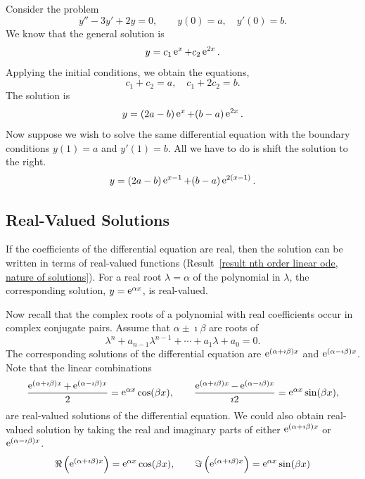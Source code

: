 \begin{Example}
  Consider the problem
  \[ 
  y'' - 3 y' + 2 y = 0, \qquad y(0) = a, \quad y'(0) = b.
  \]
  We know that the general solution is
  \[
  y = c_1 \mathop{\mathrm{e}}\nolimits^x + c_2 \mathop{\mathrm{e}}\nolimits^{2x}.
  \]
  Applying the initial conditions, we obtain the equations,
  \[
  c_1 + c_2 = a, \quad c_1 + 2 c_2 = b.
  \]
  The solution is
  \[
  y = (2 a - b) \mathop{\mathrm{e}}\nolimits^x + (b - a) \mathop{\mathrm{e}}\nolimits^{2 x}.
  \]
  Now suppose we wish to solve the same differential equation with the 
  boundary conditions $y(1) = a$ and $y'(1) = b$.  All we have to do is 
  shift the solution to the right.
  \[
  y = (2 a - b) \mathop{\mathrm{e}}\nolimits^{x-1} + (b - a) \mathop{\mathrm{e}}\nolimits^{2 (x-1)}.
  \]
\end{Example}











\subsection{Real-Valued Solutions}




If the coefficients of the differential equation are real, then the solution
can be written in terms of real-valued functions
(Result~\ref{result nth order linear ode, nature of solutions}).   
For a real root $\lambda = \alpha$ of the polynomial in $\lambda$, the corresponding
solution, $y = \mathop{\mathrm{e}}\nolimits^{\alpha x}$, is real-valued.  

Now recall that the complex
roots of a polynomial with real coefficients occur in complex conjugate
pairs.  Assume that $\alpha \pm \imath \beta$ are roots of
\[
\lambda^n + a_{n-1} \lambda^{n-1} + \cdots + a_1 \lambda + a_0 = 0.
\]
The corresponding solutions of the differential equation are
$\mathop{\mathrm{e}}\nolimits^{(\alpha + \imath \beta)x}$ and $\mathop{\mathrm{e}}\nolimits^{(\alpha - \imath \beta)x}$.  Note that the
linear combinations
\[
\frac{ \mathop{\mathrm{e}}\nolimits^{(\alpha + \imath \beta)x} + \mathop{\mathrm{e}}\nolimits^{(\alpha - \imath \beta)x}}{2}
= \mathop{\mathrm{e}}\nolimits^{\alpha x} \cos (\beta x), \qquad
\frac{ \mathop{\mathrm{e}}\nolimits^{(\alpha + \imath \beta)x} - \mathop{\mathrm{e}}\nolimits^{(\alpha - \imath \beta)x}}{\imath 2}
= \mathop{\mathrm{e}}\nolimits^{\alpha x} \sin (\beta x),
\]
are real-valued solutions of the differential equation.
We could also obtain real-valued solution by taking the real and imaginary
parts of either $\mathop{\mathrm{e}}\nolimits^{(\alpha + \imath \beta)x}$ or $\mathop{\mathrm{e}}\nolimits^{(\alpha - \imath \beta)x}$.  
\[
\Re \left( \mathop{\mathrm{e}}\nolimits^{(\alpha + \imath \beta)x} \right) = \mathop{\mathrm{e}}\nolimits^{\alpha x} \cos(\beta x), \qquad
\Im \left( \mathop{\mathrm{e}}\nolimits^{(\alpha + \imath \beta)x} \right) = \mathop{\mathrm{e}}\nolimits^{\alpha x} \sin(\beta x)
\]





